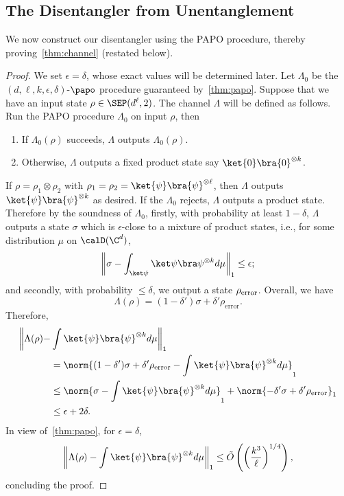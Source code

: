 \subsection{The Disentangler from Unentanglement}
We now construct our disentangler using the PAPO procedure, thereby proving~\cref{thm:channel} (restated below).

\TheoChannel*

\begin{proof}
We set $\epsilon=\delta$, whose exact values will be determined later. Let $\Lambda_0$ be the $(d,\ell,k,\epsilon,\delta)$-$\papo$ procedure guaranteed by~\cref{thm:papo}.
Suppose that we have an input state $\rho \in \SEP(d^\ell,2)$.
The channel $\Lambda$ will be defined as follows. Run the PAPO procedure $\Lambda_0$ on input $\rho$, then
  \begin{enumerate}
    \item If $\Lambda_0(\rho)$ succeeds, $\Lambda$ outputs $\Lambda_0(\rho)$.
    \item Otherwise, $\Lambda$ outputs a fixed product state say $\ket{0}\bra{0}^{\otimes k}$.
  \end{enumerate}
If $\rho = \rho_1 \otimes \rho_2$ with $\rho_1 = \rho_2 = \ket{\psi}\bra{\psi}^{\otimes \ell}$, then $\Lambda$ outputs $\ket{\psi}\bra{\psi}^{\otimes k}$ as desired. If the $\Lambda_0$
rejects, $\Lambda$ outputs a product state. Therefore by the soundness of $\Lambda_0$, firstly, with probability at least $1-\delta$, $\Lambda$ outputs a state $\sigma$ which is $\epsilon$-close to a mixture of product states, i.e., for some distribution $\mu$ on $\calD(\C^d)$,
  \begin{equation*}
      \left\|\sigma-\int _{\ket\psi} \ket\psi\bra\psi ^{\otimes k} d \mu \right\|_1\le \epsilon;
  \end{equation*}
and secondly, with probability $\le\delta$, we output a state $\rho_{\textup{error}}$. 
Overall, we have
  \[
    \Lambda(\rho) = (1-\delta') \sigma + \delta' \rho_{\mathrm{error}}.
  \]
Therefore, 
  \begin{align*}
  \bigg\lVert 
    \Lambda(\rho) - &\int \ket{\psi}\bra{\psi}^{\otimes k}d\mu
  \bigg\rVert _1 
  \\
  &= \norm{(1-\delta') \sigma + \delta' \rho_{\textup{error}} - \int \ket{\psi}\bra{\psi}^{\otimes k}d\mu}_1
  \\
  &\le 
    \norm{\sigma - \int \ket{\psi}\bra{\psi}^{\otimes k}d\mu}_1+
    \norm{-\delta' \sigma + \delta' \rho_{\textup{error}}}_1
  \\
  &\le \epsilon + 2\delta.
  \end{align*}
In view of~\cref{thm:papo}, 
for $\epsilon=\delta$,  
\[
    \left\| 
        \Lambda(\rho) - \int \ket{\psi}\bra{\psi}^{\otimes k}d\mu
    \right\|_1 \le \tilde O\left(
        \left(\frac{k^3}{\ell}\right)^{1/4}\right),
\]
concluding the proof.
\end{proof}

